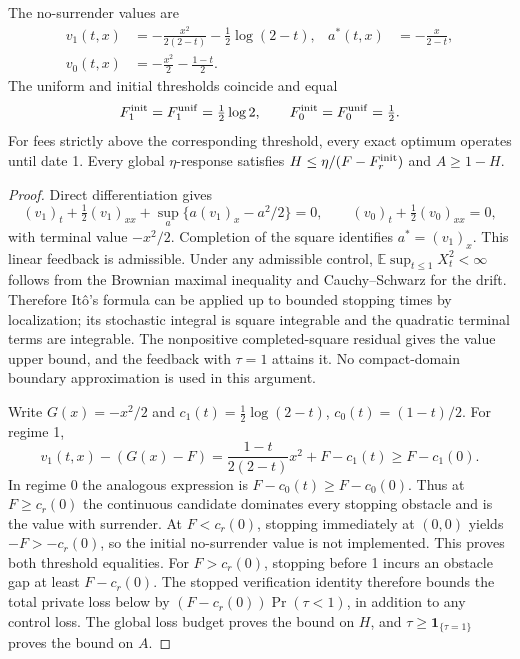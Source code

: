 \begin{proposition}
\label{prop:r19-continuous}
The no-surrender values are
\begin{align}
 v_1(t,x)&=-\frac{x^2}{2(2-t)}-\frac12\log(2-t),&
 a^*(t,x)&=-\frac{x}{2-t},\\
 v_0(t,x)&=-\frac{x^2}{2}-\frac{1-t}{2}.&&
 \label{eq:r19-continuous-values}
\end{align}
The uniform and initial thresholds coincide and equal
\begin{equation}
 F^{\rm init}_1=F^{\rm unif}_1=\tfrac12\log2,
 \qquad
 F^{\rm init}_0=F^{\rm unif}_0=\tfrac12.
 \label{eq:r19-continuous-thresholds}
\end{equation}
For fees strictly above the corresponding threshold, every exact optimum operates until date 1. Every global $\eta$-response satisfies $H\leq\eta/(F-F^{\rm init}_r)$ and $A\geq1-H$.
\end{proposition}
\begin{proof}
Direct differentiation gives
\[
 (v_1)_t+\tfrac12(v_1)_{xx}+\sup_a\{a(v_1)_x-a^2/2\}=0,
 \qquad
 (v_0)_t+\tfrac12(v_0)_{xx}=0,
\]
with terminal value $-x^2/2$. Completion of the square identifies $a^*=(v_1)_x$. This linear feedback is admissible. Under any admissible control, $\mathbb E\sup_{t\leq1}X_t^2<\infty$ follows from the Brownian maximal inequality and Cauchy--Schwarz for the drift. Therefore It\^o's formula can be applied up to bounded stopping times by localization; its stochastic integral is square integrable and the quadratic terminal terms are integrable. The nonpositive completed-square residual gives the value upper bound, and the feedback with $\tau=1$ attains it. No compact-domain boundary approximation is used in this argument.

Write $G(x)=-x^2/2$ and $c_1(t)=\tfrac12\log(2-t)$, $c_0(t)=(1-t)/2$. For regime 1,
\[
 v_1(t,x)-(G(x)-F)=\frac{1-t}{2(2-t)}x^2+F-c_1(t)\geq F-c_1(0).
\]
In regime 0 the analogous expression is $F-c_0(t)\geq F-c_0(0)$. Thus at $F\geq c_r(0)$ the continuous candidate dominates every stopping obstacle and is the value with surrender. At $F<c_r(0)$, stopping immediately at $(0,0)$ yields $-F>-c_r(0)$, so the initial no-surrender value is not implemented. This proves both threshold equalities. For $F>c_r(0)$, stopping before 1 incurs an obstacle gap at least $F-c_r(0)$. The stopped verification identity therefore bounds the total private loss below by $(F-c_r(0))\Pr(\tau<1)$, in addition to any control loss. The global loss budget proves the bound on $H$, and $\tau\geq\mathbf1_{\{\tau=1\}}$ proves the bound on $A$.
\end{proof}

